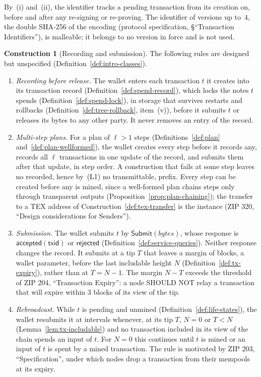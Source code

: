 \documentclass[11pt,a4paper]{article}
\theoremstyle{definition}
\newtheorem{construction}[theorem]{Construction}
\begin{document}
By~(i) and~(ii), the identifier tracks a pending transaction from its
creation on, before and after any re-signing or re-proving. The identifier of
versions up to~$4$, the double SHA-256 of the encoding (protocol
specification, \S``Transaction Identifiers''), is malleable; it belongs to no
version in force and is not used.

\begin{construction}[Recording and submission]
The following rules are designed but unspecified
(Definition~\ref{def:intro-classes}).
\begin{enumerate}[label=(L\arabic*)]
\item \emph{Recording before release.} The wallet enters each transaction
  $t$ it creates into its transaction record
  (Definition~\ref{def:spend-record}), which locks the notes $t$ spends
  (Definition~\ref{def:spend-lock}), in storage that survives restarts and
  rollbacks (Definition~\ref{def:tree-rollback}, item~(v)), before it
  submits $t$ or releases its bytes to any other party. It never removes an
  entry of the record.
\item \emph{Multi-step plans.} For a plan of $\ell > 1$ steps
  (Definitions~\ref{def:plan} and~\ref{def:plan-wellformed}), the wallet
  creates every step before it records any, records all $\ell$ transactions
  in one update of the record, and submits them after that update, in step
  order. A construction that fails at some step leaves no recorded, hence
  by~(L1) no transmittable, prefix. Every step can be created before any is
  mined, since a well-formed plan chains steps only through transparent
  outputs (Proposition~\ref{prop:plan-chaining}); the transfer to a TEX
  address of Construction~\ref{def:tex-transfer} is the instance (ZIP 320,
  ``Design considerations for Senders'').
\item \emph{Submission.} The wallet submits $t$ by
  $\mathsf{Submit}(\mathit{bytes})$, whose response is
  $\mathsf{accepted}(\mathsf{txid})$ or $\mathsf{rejected}$
  (Definition~\ref{def:service-queries}). Neither response changes the record.
  It submits at a tip $T$ that leaves a margin of blocks, a wallet parameter,
  before the last includable height $N$ (Definition~\ref{def:tx-expiry}), rather
  than at $T = N - 1$. The margin $N - T$ exceeds the threshold of ZIP 204,
  ``Transaction Expiry'': a node SHOULD NOT relay a transaction that will
  expire within $3$ blocks of its view of the tip.
\item \emph{Rebroadcast.} While $t$ is pending and unmined
  (Definition~\ref{def:life-states}), the wallet resubmits it at intervals
  whenever, at its tip $T$, $N = 0$ or $T < N$
  (Lemma~\ref{lem:tx-includable}) and no transaction included in its view
  of the chain spends an input of $t$. For $N = 0$ this continues until $t$
  is mined or an input of $t$ is spent by a mined transaction. The rule is
  motivated by ZIP 203, ``Specification'', under which nodes drop a
  transaction from their mempools at its expiry.
\end{enumerate}
\end{construction}
\end{document}
